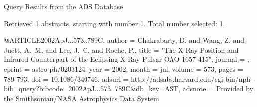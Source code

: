 Query Results from the ADS Database


Retrieved 1 abstracts, starting with number 1.  Total number selected: 1.

@ARTICLE{2002ApJ...573..789C,
   author = {{Chakrabarty}, D. and {Wang}, Z. and {Juett}, A.~M. and {Lee}, J.~C. and 
	{Roche}, P.},
    title = "{The X-Ray Position and Infrared Counterpart of the Eclipsing X-Ray Pulsar OAO 1657-415}",
  journal = {\apj},
   eprint = {astro-ph/0203124},
     year = 2002,
    month = jul,
   volume = 573,
    pages = {789-793},
      doi = {10.1086/340746},
   adsurl = {http://adsabs.harvard.edu/cgi-bin/nph-bib_query?bibcode=2002ApJ...573..789C&db_key=AST},
  adsnote = {Provided by the Smithsonian/NASA Astrophysics Data System}
}


